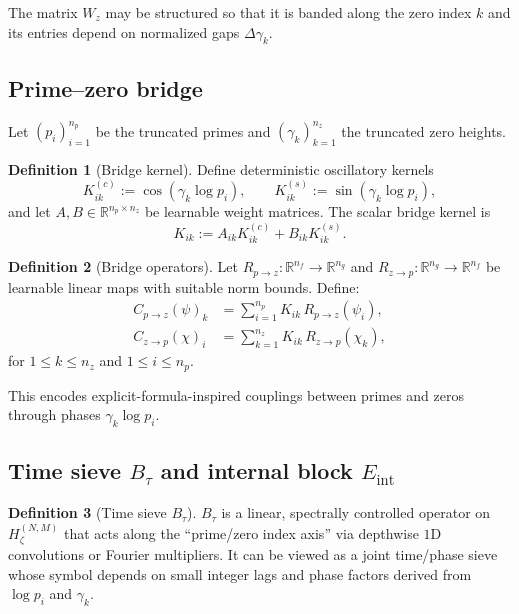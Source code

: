 \documentclass[11pt]{article}
\theoremstyle{definition}
\newtheorem{definition}{Definition}
\theoremstyle{plain}
\begin{document}
The matrix $W_z$ may be structured so that it is banded along the zero index $k$ and its entries depend on normalized gaps $\Delta\gamma_k$.

\subsection{Prime--zero bridge}

Let $(p_i)_{i=1}^{n_p}$ be the truncated primes and $(\gamma_k)_{k=1}^{n_z}$ the truncated zero heights.

\begin{definition}[Bridge kernel]
Define deterministic oscillatory kernels
\[
  K^{(c)}_{ik} := \cos(\gamma_k \log p_i),
  \qquad
  K^{(s)}_{ik} := \sin(\gamma_k \log p_i),
\]
and let $A,B \in \mathbb{R}^{n_p \times n_z}$ be learnable weight matrices.
The scalar bridge kernel is
\[
  K_{ik} := A_{ik} K^{(c)}_{ik} + B_{ik} K^{(s)}_{ik}.
\]
\end{definition}

\begin{definition}[Bridge operators]
Let $R_{p\to z} : \mathbb{R}^{n_f}\to\mathbb{R}^{n_g}$ and $R_{z\to p} : \mathbb{R}^{n_g}\to\mathbb{R}^{n_f}$ be learnable linear maps with suitable norm bounds.
Define:
\begin{align*}
  C_{p\to z}(\psi)_k &= \sum_{i=1}^{n_p} K_{ik}\, R_{p\to z}(\psi_i), \\
  C_{z\to p}(\chi)_i &= \sum_{k=1}^{n_z} K_{ik}\, R_{z\to p}(\chi_k),
\end{align*}
for $1 \le k \le n_z$ and $1 \le i \le n_p$.
\end{definition}

This encodes explicit-formula-inspired couplings between primes and zeros through phases $\gamma_k\log p_i$.

\subsection{Time sieve $B_\tau$ and internal block $E_{\mathrm{int}}$}

\begin{definition}[Time sieve $B_\tau$]
$B_\tau$ is a linear, spectrally controlled operator on $H_\zeta^{(N,M)}$ that acts along the “prime/zero index axis” via depthwise $1$D convolutions or Fourier multipliers.
It can be viewed as a joint time/phase sieve whose symbol depends on small integer lags and phase factors derived from $\log p_i$ and $\gamma_k$.
\end{definition}
\end{document}
